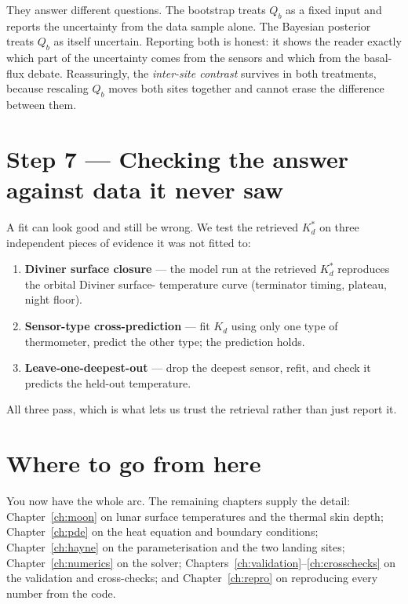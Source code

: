 \documentclass[11pt]{report}
\begin{document}
\begin{aside}
They answer different questions. The bootstrap treats $Q_b$ as a
fixed input and reports the uncertainty from the data sample alone.
The Bayesian posterior treats $Q_b$ as itself uncertain. Reporting
both is honest: it shows the reader exactly which part of the
uncertainty comes from the sensors and which from the basal-flux
debate. Reassuringly, the \emph{inter-site contrast} survives in
both treatments, because rescaling $Q_b$ moves both sites together
and cannot erase the difference between them.
\end{aside}

\section{Step 7 --- Checking the answer against data it never saw}

A fit can look good and still be wrong. We test the retrieved
$K_d^{*}$ on three independent pieces of evidence it was not fitted
to:

\begin{enumerate}
\item \textbf{Diviner surface closure} --- the model run at the
  retrieved $K_d^{*}$ reproduces the orbital Diviner surface-
  temperature curve (terminator timing, plateau, night floor).
\item \textbf{Sensor-type cross-prediction} --- fit $K_d$ using only
  one type of thermometer, predict the other type; the prediction
  holds.
\item \textbf{Leave-one-deepest-out} --- drop the deepest sensor,
  refit, and check it predicts the held-out temperature.
\end{enumerate}

All three pass, which is what lets us trust the retrieval rather
than just report it.

\section{Where to go from here}

You now have the whole arc. The remaining chapters supply the
detail: Chapter~\ref{ch:moon} on lunar surface temperatures and the
thermal skin depth; Chapter~\ref{ch:pde} on the heat equation and
boundary conditions; Chapter~\ref{ch:hayne} on the
\citet{hayne2017} parameterisation and the two landing sites;
Chapter~\ref{ch:numerics} on the solver; Chapters~\ref{ch:validation}--\ref{ch:crosschecks}
on the validation and cross-checks; and Chapter~\ref{ch:repro} on
reproducing every number from the code.
\end{document}
